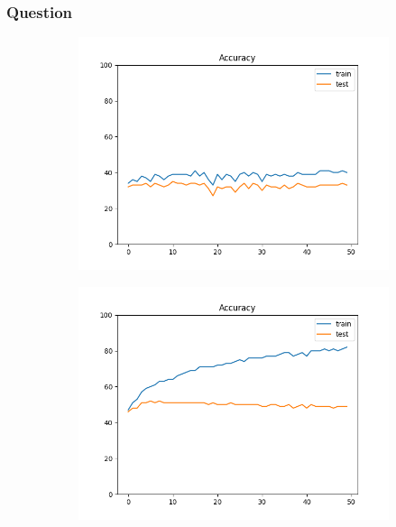 \documentclass[12pt]{article}
\begin{document}
\subsubsection{Question}

\begin{figure}
  \begin{subfigure}{0.16\textwidth}
    \centering
    \includegraphics[width=\linewidth]{accuracies_2_1.png}
  \end{subfigure}
  \begin{subfigure}{0.16\textwidth}
    \centering
    \includegraphics[width=\linewidth]{accuracies_2_2.png}
  \end{subfigure}
  \begin{subfigure}{0.16\textwidth}

\end{subfigure}
\end{figure}
\end{document}
